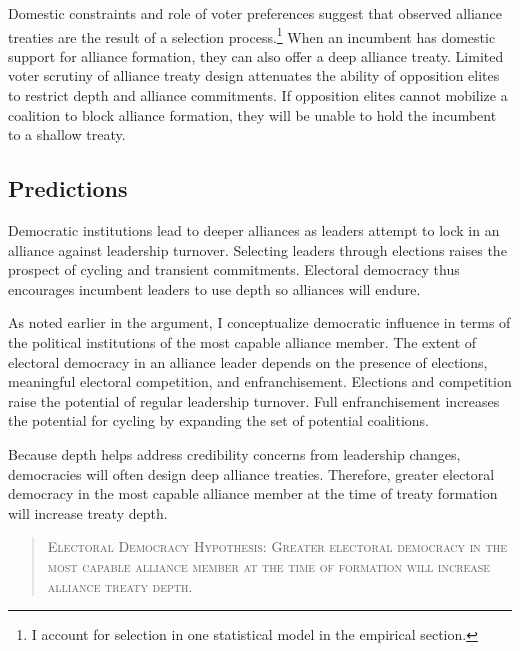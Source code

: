 \documentclass[12pt]{article}
\begin{document}
Domestic constraints and role of voter preferences suggest that observed alliance treaties are the result of a selection process.\footnote{I account for selection in one statistical model in the empirical section.} 
When an incumbent has domestic support for alliance formation, they can also offer a deep alliance treaty. 
Limited voter scrutiny of alliance treaty design attenuates the ability of opposition elites to restrict depth and alliance commitments.
If opposition elites cannot mobilize a coalition to block alliance formation, they will be unable to hold the incumbent to a shallow treaty. 



\subsection{Predictions}


Democratic institutions lead to deeper alliances as leaders attempt to lock in an alliance against leadership turnover. 
Selecting leaders through elections raises the prospect of cycling and transient commitments. 
Electoral democracy thus encourages incumbent leaders to use depth so alliances will endure.


As noted earlier in the argument, I conceptualize democratic influence in terms of the political institutions of the most capable alliance member.
The extent of electoral democracy in an alliance leader depends on the presence of elections, meaningful electoral competition, and enfranchisement. 
Elections and competition raise the potential of regular leadership turnover. 
Full enfranchisement increases the potential for cycling by expanding the set of potential coalitions. 


Because depth helps address credibility concerns from leadership changes, democracies will often design deep alliance treaties. 
Therefore, greater electoral democracy in the most capable alliance member at the time of treaty formation will increase treaty depth. 


\begin{quote}
\textsc{Electoral Democracy Hypothesis: Greater electoral democracy in the most capable alliance member at the time of formation will increase alliance treaty depth.}
\end{quote}   
\end{document}
